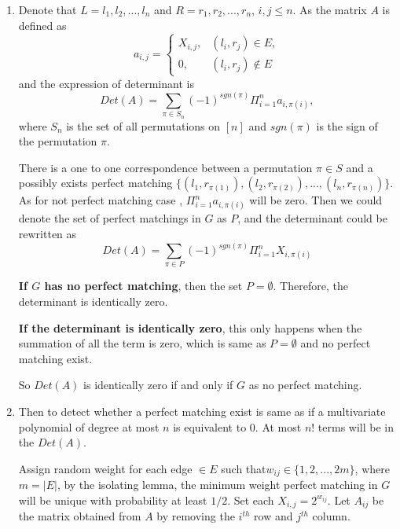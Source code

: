 \documentclass{assignment}
\begin{document}
    \maketitle

    \newpage

	    \begin{homeworkProblem}
	    \begin{enumerate}
	    \item Denote that $L = {l_1,l_2,...,l_n}$ and $R = {r_1,r_2,...,r_n}$, $i, j \leq n$.  As the matrix $A$ is defined as 
	    $$a_{i,j}=
\begin{cases}
X_{i,j}, & (l_i,r_j)\in E,\\
0, & (l_i,r_j)\notin E
\end{cases}$$
and the expression of determinant is 
$$Det(A)=\sum_{\pi \in S_n} (-1)^{sgn(\pi)} \Pi_{i=1}^n a_{i,\pi (i)},$$
where $S_n$ is the set of all permutations on $[n]$ and $sgn(\pi)$ is the sign of the permutation $\pi$. 

There is a one to one correspondence between a permutation $\pi \in S$ and a possibly exists perfect matching $\{ (l_1,r_{\pi(1)}),  (l_2,r_{\pi(2)}),..., (l_n,r_{\pi(n)})  \}$. As for not perfect matching case , $\Pi_{i=1}^n a_{i,\pi (i)}$ will be zero. Then we could denote the set of perfect matchings in $G$ as $P$, and the determinant could be rewritten as 
$$Det(A)=\sum_{\pi \in P} (-1)^{sgn(\pi)} \Pi_{i=1}^n X_{i,\pi (i)}$$


\textbf{If $G$ has no perfect matching}, then the set $P=\emptyset$. Therefore, the determinant is identically zero.

\textbf{If the determinant is identically zero}, this only happens when the summation of all the term is zero, which is same as $P=\emptyset$ and no perfect matching exist.

So $Det(A)$ is identically zero if and only if $G$ as no perfect matching. 

\item Then to detect whether a perfect matching exist is same as if a multivariate polynomial of degree at most $n$ is equivalent to 0. At most $n!$ terms will be in the $Det(A)$. 

Assign random weight for each edge $\in E$ such that$w_{ij} \in \{ 1,2,...,2m \}$, where $m=|E|$, by the isolating lemma, the minimum weight perfect matching in $G$ will be unique with probability at least $1/2$. Set each $X_{i,j}=2^{w_{ij}}$. Let $A_{ij}$ be the matrix obtained from $A$ by removing the $i^{th}$ row and $j^{th}$ column. 


\end{enumerate}
\end{homeworkProblem}
\end{document}
